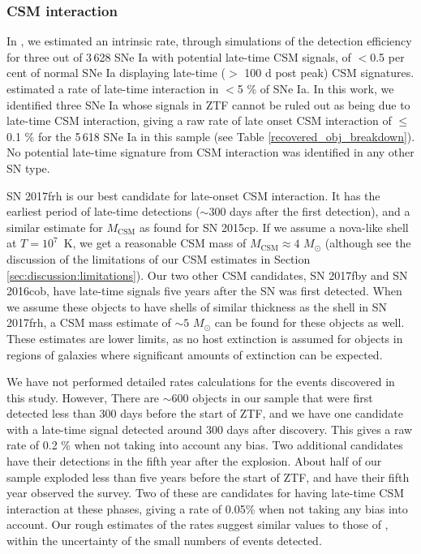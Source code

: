 \documentclass[a4paper,oneside,12pt, class=Latex/Classes/PhDthesisPSnPDF, crop=false]{standalone}
\begin{document}
\subsubsection{CSM interaction}
In \citet{Terwel_2024_paper1}, we estimated an intrinsic rate, through simulations of the detection efficiency for three out of 3\,628 SNe Ia with potential late-time CSM signals, of $<$0.5 per cent of normal SNe Ia displaying late-time ($>$ 100 d post peak) CSM signatures. \cite{GALEX_Late_CSM} estimated a rate of late-time interaction in $<$5 \% of SNe Ia. In this work, we identified three SNe Ia whose signals in ZTF cannot be ruled out as being due to late-time CSM interaction, giving a raw rate of late onset CSM interaction of $\leq$0.1 \% for the 5\,618 SNe Ia in this sample (see Table \ref{recovered_obj_breakdown}). No potential late-time signature from CSM interaction was identified in any other SN type.

SN 2017frh is our best candidate for late-onset CSM interaction. It has the earliest period of late-time detections ($\sim 300$ days after the first detection), and a similar estimate for $M_\text{CSM}$ as \citet{2015cp} found for SN 2015cp. If we assume a nova-like shell at $T=10^7$~K, we get a reasonable CSM mass of $M_\text{CSM} \approx 4$ $M_\odot$ (although see the discussion of the limitations of our CSM estimates in Section \ref{sec:discussion:limitations}). Our two other CSM candidates, SN 2017fby and SN 2016cob, have late-time signals five years after the SN was first detected. When we assume these objects to have shells of similar thickness as the shell in SN 2017frh, a CSM mass estimate of $\sim 5$ $M_\odot$ can be found for these objects as well. These estimates are lower limits, as no host extinction is assumed for objects in regions of galaxies where significant amounts of extinction can be expected.

We have not performed detailed rates calculations for the events discovered in this study. However, There are $\sim600$ objects in our sample that were first detected less than 300 days before the start of ZTF, and we have one candidate with a late-time signal detected around 300 days after discovery. This gives a raw rate of 0.2 \% when not taking into account any bias. Two additional candidates have their detections in the fifth year after the explosion. About half of our sample exploded less than five years before the start of ZTF, and have their fifth year observed the survey. Two of these are candidates for having late-time CSM interaction at these phases, giving a rate of 0.05\% when not taking any bias into account. Our rough estimates of the rates suggest similar values to those of \citet{Terwel_2024_paper1}, within the uncertainty of the small numbers of events detected.
\end{document}
